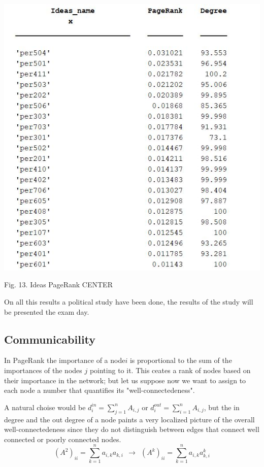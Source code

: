 \documentclass{article}%
\begin{document}
\begin{center}
\includegraphics[scale=0.5]{PageRank_ideas_center}

\begin{small}
Fig. 13. Ideas PageRank CENTER
\end{small}
\end{center}

On all this results a political study have been done, the results of the study will be presented the exam day.




\subsection*{Communicability}

In PageRank the importance of a node$i$  is proportional to the sum of the importances of the nodes $j$ pointing to it. This ceates a rank of nodes based on their importance in the network; but let us suppose now we want to assign to each node a number that quantifies its "well-connectedeness".

A natural choise would be $d_i^{in}= \sum_{j=1}^n A_{i,j}$ or $d_i^{out}= \sum_{i=1}^n A_{i,j}$, but the in degree and the out degree of a node paints a very localized picture of the overall well-connectedeness since they do not distinguish between edges that connect well connected or poorly connected nodes.
\[ (A^{2})_{ii}= \sum_{k=1}^n a_{i,k}a_{k,i}~~\rightarrow~~
(A^{k})_{ii}= \sum_{k=1}^n a_{i,k}a_{k,i}^k
\]
\end{document}
